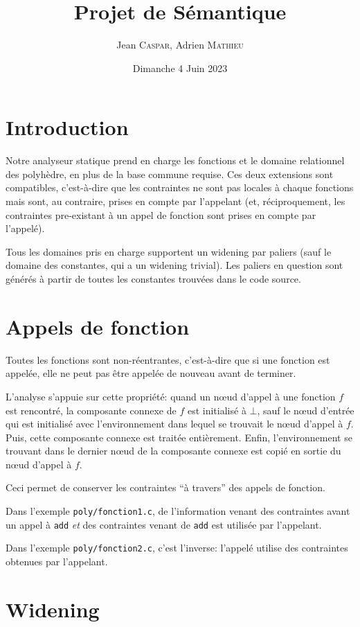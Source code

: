 \documentclass{scrartcl}
\title{Projet de Sémantique}
\author{%
  Jean \textsc{Caspar},
  Adrien \textsc{Mathieu}
}
\date{Dimanche 4 Juin 2023}
\begin{document}
\maketitle{}

\section*{Introduction}
Notre analyseur statique prend en charge les fonctions et le domaine relationnel des polyhèdre,
en plus de la base commune requise. Ces deux extensions sont compatibles, c'est-à-dire que les
contraintes ne sont pas locales à chaque fonctions mais sont, au contraire, prises en compte par
l'appelant (et, réciproquement, les contraintes pre-existant à un appel de fonction sont prises
en compte par l'appelé).\par
Tous les domaines pris en charge supportent un widening par paliers (sauf le domaine des
constantes, qui a un widening trivial). Les paliers en question sont
générés à partir de toutes les constantes trouvées dans le code source.

\section*{Appels de fonction}
Toutes les fonctions sont non-réentrantes, c'est-à-dire que si une fonction est appelée, elle ne
peut pas être appelée de nouveau avant de terminer.\par
L'analyse s'appuie sur cette propriété: quand un n\oe{}ud d'appel à une fonction \(f\) est
rencontré, la composante connexe de \(f\) est initialisé à \(\bot\), sauf le n\oe{}ud d'entrée
qui est initialisé avec l'environnement dans lequel se trouvait le n\oe{}ud d'appel à \(f\).
Puis, cette composante connexe est traitée entièrement. Enfin, l'environnement se trouvant dans
le dernier n\oe{}ud de la composante connexe est copié en sortie du n\oe{}ud d'appel à \(f\).\par
Ceci permet de conserver les contraintes ``à travers'' des appels de fonction.\par
Dans l'exemple \verb|poly/fonction1.c|, de l'information venant des contraintes avant un appel à
\verb|add| \emph{et} des contraintes venant de \verb|add| est utilisée par l'appelant.\par
Dans l'exemple \verb|poly/fonction2.c|, c'est l'inverse: l'appelé utilise des contraintes
obtenues par l'appelant.

\section*{Widening}
\end{document}
